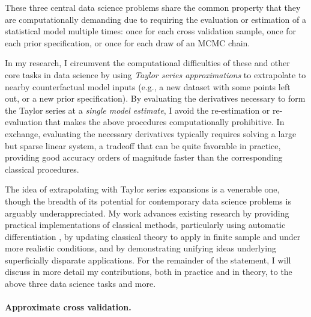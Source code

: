 
These three central data science problems share the common property that they
are computationally demanding due to requiring the evaluation or estimation of a
statistical model multiple times: once for each cross validation sample, once
for each prior specification, or once for each draw of an MCMC chain.

In my research, I circumvent the computational difficulties of these and other
core tasks in data science by using {\em Taylor series approximations} to
extrapolate to nearby counterfactual model inputs (e.g., a new dataset with some
points left out, or a new prior specification). By evaluating the derivatives
necessary to form the Taylor series at a {\em single model estimate}, I avoid
the re-estimation or re-evaluation that makes the above procedures
computationally prohibitive.  In exchange, evaluating the necessary derivatives
typically requires solving a large but sparse linear system, a tradeoff that can
be quite favorable in practice, providing good accuracy orders of magnitude
faster than the corresponding classical procedures.

The idea of extrapolating with Taylor series expansions is a venerable one,
though the breadth of its potential for contemporary data science problems is
arguably underappreciated. My work advances existing research by providing
practical implementations of classical methods, particularly using automatic
differentiation \citep{baydin:2015:automatic}, by updating classical theory to
apply in finite sample and under more realistic conditions, and by demonstrating
unifying ideas underlying superficially disparate applications. For the
remainder of the statement, I will discuss in more detail my contributions, both
in practice and in theory, to the above three data science tasks and more.




\newpage

\paragraph{Approximate cross validation.}


